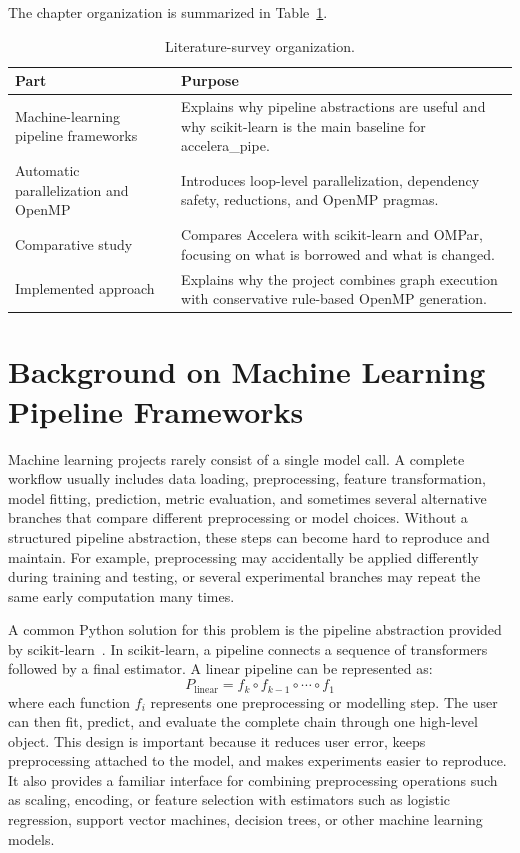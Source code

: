 \documentclass[12pt,a4paper,oneside]{report}
\begin{document}
The chapter organization is summarized in Table~\ref{tab:literature-map}.

\begin{table}[!htbp]
\centering
\caption{Literature-survey organization.}
\label{tab:literature-map}
\small
\renewcommand{\arraystretch}{1.12}
\setlength{\tabcolsep}{4pt}
\begin{tabularx}{\textwidth}{p{}X}
\toprule
Part & Purpose \\
\midrule
Machine-learning pipeline frameworks &
Explains why pipeline abstractions are useful and why
scikit-learn is the main baseline for accelera\_pipe. \\

Automatic parallelization and OpenMP &
Introduces loop-level parallelization, dependency safety, reductions, and
OpenMP pragmas. \\

Comparative study &
Compares Accelera with scikit-learn and OMPar, focusing on what is
borrowed and what is changed. \\

Implemented approach &
Explains why the project combines graph execution with conservative rule-based
OpenMP generation. \\
\bottomrule
\end{tabularx}
\renewcommand{\arraystretch}{1.0}
\end{table}

\section{Background on Machine Learning Pipeline Frameworks}
Machine learning projects rarely consist of a single model call. A complete
workflow usually includes data loading, preprocessing, feature transformation,
model fitting, prediction, metric evaluation, and sometimes several alternative
branches that compare different preprocessing or model choices. Without a
structured pipeline abstraction, these steps can become hard to reproduce and
maintain. For example, preprocessing may accidentally be applied differently
during training and testing, or several experimental branches may repeat the same
early computation many times.

A common Python solution for this problem is the pipeline abstraction provided by
scikit-learn~\cite{pedregosa2011scikit}. In scikit-learn, a
pipeline connects a sequence of transformers followed by a final estimator. A
linear pipeline can be represented as:
\[
P_{\text{linear}} = f_k \circ f_{k-1} \circ \cdots \circ f_1
\]
where each function \(f_i\) represents one preprocessing or modelling step. The
user can then fit, predict, and evaluate the complete chain through one
high-level object. This design is important because it reduces user error, keeps
preprocessing attached to the model, and makes experiments easier to reproduce.
It also provides a familiar interface for combining preprocessing operations
such as scaling, encoding, or feature selection with estimators such as logistic
regression, support vector machines, decision trees, or other machine learning
models.
\end{document}
